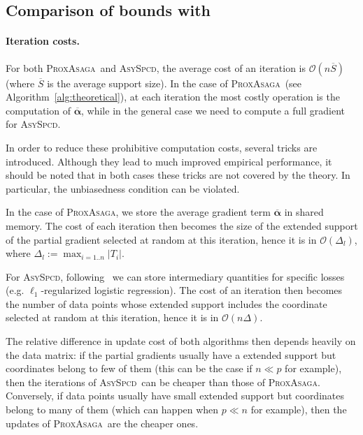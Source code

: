 \documentclass{article}
\newcommand{\PASAGA}{\textsc{ProxAsaga}}
\newcommand{\AsySPCD}{\textsc{AsySpcd}}
\begin{document}
%
%
%
%



\subsection{Comparison of bounds with~\citet{liu2015asynchronous2}}\label{apx:liu}
\paragraph{Iteration costs.}
For both \PASAGA\ and \AsySPCD, the average cost of an iteration is $\mathcal{O}(n \overline S)$ (where $\overline S$ is the average support size).
In the case of \PASAGA\ (see Algorithm~\ref{alg:theoretical}), at each iteration the most costly operation is the computation of $\overline {\boldsymbol\alpha}$, while in the general case we need to compute a full gradient for \AsySPCD.

In order to reduce these prohibitive computation costs, several tricks are introduced.
Although they lead to much improved empirical performance, it should be noted that in both cases these tricks are not covered by the theory.
In particular, the unbiasedness condition can be violated.

In the case of \PASAGA, we store the average gradient term $\overline {\boldsymbol\alpha}$ in shared memory.
The cost of each iteration then becomes the size of the extended support of the partial gradient selected at random at this iteration, hence it is in $\mathcal{O}(\Delta_l)$, where $\Delta_l := \max_{i=1..n} |T_i|$.

For \AsySPCD, following~\citet{peng2016arock} we can store intermediary quantities for specific losses (e.g. $\ell_1$-regularized logistic regression).
The cost of an iteration then becomes the number of data points whose extended support includes the coordinate selected at random at this iteration, hence it is in $\mathcal{O}(n \Delta)$.

The relative difference in update cost of both algorithms then depends heavily on the data matrix: if the partial gradients usually have a extended support but coordinates belong to few of them (this can be the case if $n \ll p$ for example), then the iterations of \AsySPCD\ can be cheaper than those of \PASAGA.
Conversely, if data points usually have small extended support but coordinates belong to many of them (which can happen when $p \ll n$ for example), then the updates of \PASAGA\ are the cheaper ones.
\end{document}
